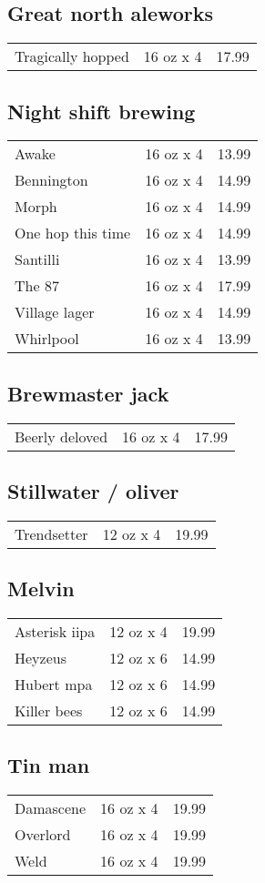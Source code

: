 \documentclass{article}%
\begin{document}
\begin{multicols}{3}
%
\subsection*{Great north aleworks}%
\begin{tabular}{l c r}%
Tragically hopped&16 oz x 4&17.99\\%
\end{tabular}

%
\subsection*{Night shift brewing}%
\begin{tabular}{l c r}%
Awake&16 oz x 4&13.99\\%
Bennington&16 oz x 4&14.99\\%
Morph&16 oz x 4&14.99\\%
One hop this time&16 oz x 4&14.99\\%
Santilli&16 oz x 4&13.99\\%
The 87&16 oz x 4&17.99\\%
Village lager&16 oz x 4&14.99\\%
Whirlpool&16 oz x 4&13.99\\%
\end{tabular}

%
\subsection*{Brewmaster jack}%
\begin{tabular}{l c r}%
Beerly deloved&16 oz x 4&17.99\\%
\end{tabular}

%
\subsection*{Stillwater / oliver}%
\begin{tabular}{l c r}%
Trendsetter&12 oz x 4&19.99\\%
\end{tabular}

%
\subsection*{Melvin}%
\begin{tabular}{l c r}%
Asterisk iipa&12 oz x 4&19.99\\%
Heyzeus&12 oz x 6&14.99\\%
Hubert mpa&12 oz x 6&14.99\\%
Killer bees&12 oz x 6&14.99\\%
\end{tabular}

%
\subsection*{Tin man}%
\begin{tabular}{l c r}%
Damascene&16 oz x 4&19.99\\%
Overlord&16 oz x 4&19.99\\%
Weld&16 oz x 4&19.99\\%
\end{tabular}

%
\end{multicols}%
\end{document}
